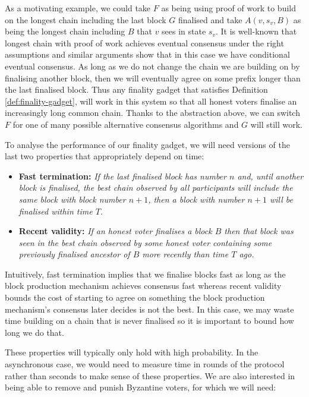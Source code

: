 \documentclass{article}
\begin{document}
As a motivating example, we could take $F$ as being using proof of work to build on the longest chain including the last block $G$ finalised and take $A(v,s_v,B)$ as being the longest chain including $B$ that $v$ sees in state $s_v$. It is well-known \cite{bitcoinpapers} that longest chain with proof of work achieves eventual consensus under the right assumptions and similar arguments show that in this case we have conditional eventual consensus.
As long as we do not change the chain we are building on by finalising another block, then we will eventually agree on some prefix longer than the last finalised block.
Thus any finality gadget that satisfies Definition \ref{def:finality-gadget}, will work in this system so that all honest voters finalise an increasingly long common chain.
Thanks to the abstraction above, we can switch $F$ for one of many possible alternative consensus algorithms and $G$ will still work.


To analyse the performance of our finality gadget, we will need versions of the last two properties that appropriately depend on time: 

\begin{itemize}
\item{\bf Fast termination:} {\em If the last finalised block has number $n$ and, until another block is finalised, the best chain observed by all participants will include the same block with block number $n+1$, then a block with number $n+1$ will be finalised within time $T$.}
\item{\bf Recent validity:} {\em If an honest voter finalises a block $B$ then that block was seen in the best chain observed by some honest voter containing some previously finalised ancestor of $B$ more recently than time $T$ ago.}
\end{itemize}

Intuitively, fast termination implies that we finalise blocks fast as long as the block production mechanism achieves consensus fast whereas recent validity bounds the cost of starting to agree on something the block production mechanism's consensus later decides is not the best. In this case, we may waste time building on a chain that is never finalised so it is important to bound how long we do that.

These properties will typically only hold with high probability. In the asynchronous case, we would need to measure time in rounds of the protocol rather than seconds to make sense of these properties.  We are also interested in being able to remove and punish Byzantine voters, for which we will need:
\end{document}
